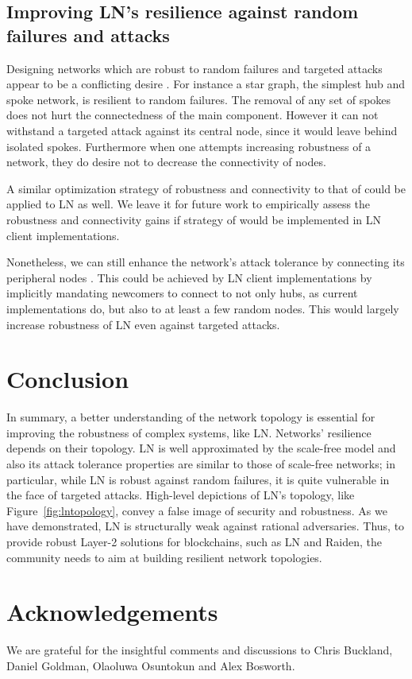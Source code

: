 \documentclass[a4paper]{article}
\theoremstyle{definition}
\begin{document}
\subsection{Improving LN's resilience against random failures and attacks}
Designing networks which are robust to random failures and targeted attacks appear to be a conflicting desire \cite{barabasi2016network}. For instance a star graph, the simplest hub and spoke network, is resilient to random failures. The removal of any set of spokes does not hurt the connectedness of the main component. However it can not withstand a targeted attack against its central node, since it would leave behind isolated spokes. Furthermore when one attempts increasing robustness of a network, they do desire not to decrease the connectivity of nodes.

A similar optimization strategy of robustness and connectivity to that of \cite{shargel2003optimization} could be applied to LN as well. We leave it for future work to empirically assess the robustness and connectivity gains if strategy of \cite{shargel2003optimization} would be implemented in LN client implementations. 

Nonetheless, we can still enhance the network's attack tolerance by connecting its peripheral nodes \cite{barabasi2016network}. This could be achieved by LN client implementations by implicitly mandating newcomers to connect to not only hubs, as current implementations do, but also to at least a few random nodes. This would largely increase robustness of LN even against targeted attacks. 

\section{Conclusion}
In summary, a better understanding of the network topology is essential
for improving the robustness of complex systems, like LN. Networks' resilience depends on their topology. LN is well approximated by the scale-free model and also its attack tolerance properties are similar to those of scale-free networks; in particular, while LN is robust against random failures, it is quite vulnerable in the face of targeted attacks. 
High-level depictions of LN's topology, like Figure~\ref{fig:lntopology}, convey a false image of security and robustness. As we have demonstrated, LN is structurally weak against rational adversaries. Thus, to provide robust Layer-2 solutions for blockchains, such as LN and Raiden, the community needs to aim at building resilient network topologies.
\section{Acknowledgements}
We are grateful for the insightful comments and discussions to Chris Buckland, Daniel Goldman, Olaoluwa Osuntokun and Alex Bosworth.



\end{document}
